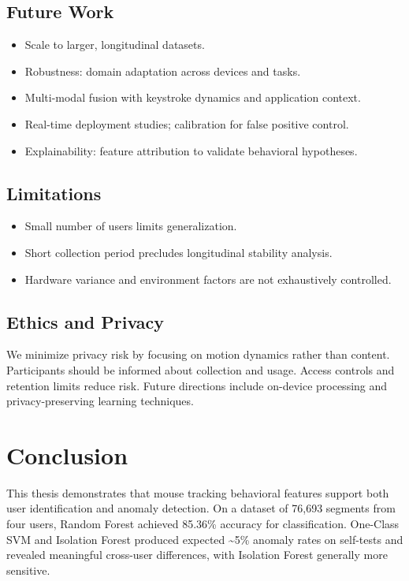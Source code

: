 \documentclass[
  12pt,
]{article}
\providecommand{\tightlist}{%
  \setlength{\itemsep}{0pt}\setlength{\parskip}{0pt}}
\begin{document}
\subsection{Future Work}\label{future-work}

\begin{itemize}
\tightlist
\item
  Scale to larger, longitudinal datasets.
\item
  Robustness: domain adaptation across devices and tasks.
\item
  Multi-modal fusion with keystroke dynamics and application context.
\item
  Real-time deployment studies; calibration for false positive control.
\item
  Explainability: feature attribution to validate behavioral hypotheses.
\end{itemize}

\subsection{Limitations}\label{limitations-1}

\begin{itemize}
\tightlist
\item
  Small number of users limits generalization.
\item
  Short collection period precludes longitudinal stability analysis.
\item
  Hardware variance and environment factors are not exhaustively
  controlled.
\end{itemize}

\subsection{Ethics and Privacy}\label{ethics-and-privacy}

We minimize privacy risk by focusing on motion dynamics rather than
content. Participants should be informed about collection and usage.
Access controls and retention limits reduce risk. Future directions
include on-device processing and privacy-preserving learning techniques.

\section{Conclusion}\label{conclusion}

This thesis demonstrates that mouse tracking behavioral features support
both user identification and anomaly detection. On a dataset of 76,693
segments from four users, Random Forest achieved 85.36\% accuracy for
classification. One-Class SVM and Isolation Forest produced expected
\textasciitilde5\% anomaly rates on self-tests and revealed meaningful
cross-user differences, with Isolation Forest generally more sensitive.
\end{document}
